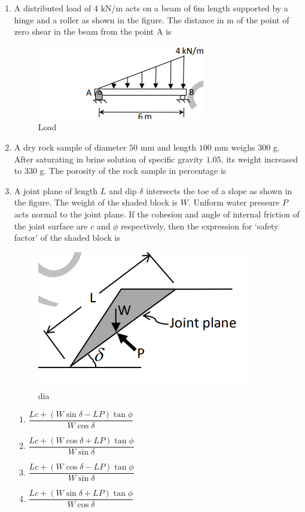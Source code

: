 \documentclass[journal,12pt,onecolumn]{IEEEtran}
\theoremstyle{remark}
\begin{document}
\begin{enumerate}
\item A distributed load of $4$ kN/m acts on a beam of $6$m length supported by a hinge and a roller as shown in the figure. The distance in m of the point of zero shear in the beam from the point A is 
\begin{figure}[H]
  \centering
  \includegraphics[width=0.4\columnwidth]{figs/load.png}
  \caption{Load}
  \label{load}
\end{figure}

\hfill{}

\item A dry rock sample of diameter $50$ mm and length $100$ mm weighs $300$ g. After saturating in brine
solution of specific gravity $1.05$, its weight increased to $330$ g. The porosity of the rock sample in
percentage is

\hfill{}

\item A joint plane of length $L$ and dip $\delta$ intersects the toe of a slope as shown in the figure. The weight of the shaded block is $W$. Uniform water pressure $P$ acts normal to the joint plane. If the cohesion and angle of internal friction of the joint surface are $c$ and $\phi$ respectively, then the expression for `safety factor' of the shaded block is 
\begin{figure}[H]
  \centering
  \includegraphics[width=0.4\columnwidth]{figs/dia2.png}
  \caption{dia}
  \label{daigram2}
\end{figure}

\hfill{}
\begin{multicols}{2}
\begin{enumerate}
\item  $\dfrac{Lc + (W \sin \delta - LP)\tan \phi}{W \cos \delta}$ 
\item  $\dfrac{Lc + (W \cos \delta + LP)\tan \phi}{W \sin \delta}$
\item  $\dfrac{Lc + (W \cos \delta - LP)\tan \phi}{W \sin \delta}$
\item  $\dfrac{Lc + (W \sin \delta + LP)\tan \phi}{W \cos \delta}$
\end{enumerate}
\end{multicols}


\end{enumerate}
\end{document}
